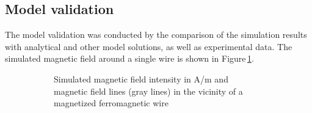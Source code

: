 \subsection{Model validation}
\label{subsec:mod_val}

The model validation was conducted by the comparison of the simulation results with analytical and other model solutions, as well as experimental data.
The simulated magnetic field around a single wire is shown in Figure\,\ref{fig:sw_mag_field}. 

\begin{figure}[H]
            \begin{subfigure}{0.49\textwidth}
                  \flushleft
                  \caption{Simulated magnetic field intensity in A/m and magnetic field lines (gray lines) in the vicinity of a magnetized ferromagnetic wire}\label{fig:sw_mag_field}
          \end{subfigure}\hfill
        \begin{subfigure}{0.49\textwidth}
                \flushright

\end{subfigure}
\end{figure}
